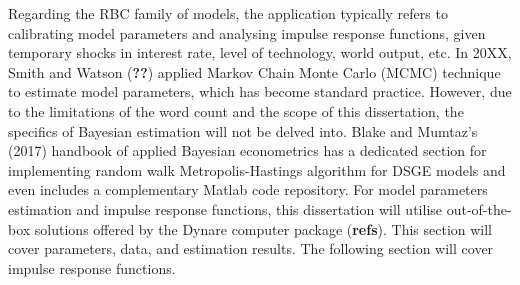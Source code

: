 Regarding the RBC family of models, the application typically refers to calibrating model parameters and analysing impulse response functions, given temporary shocks in interest rate, level of technology, world output, etc. In 20XX, Smith and Watson (\textbf{??}) applied Markov Chain Monte Carlo (MCMC) technique to estimate model parameters, which has become standard practice. However, due to the limitations of the word count and the scope of this dissertation, the specifics of Bayesian estimation will not be delved into. Blake and Mumtaz's (2017) handbook of applied Bayesian econometrics has a dedicated section for implementing random walk Metropolis-Hastings algorithm for DSGE models and even includes a complementary Matlab code repository. For model parameters estimation and impulse response functions, this dissertation will utilise out-of-the-box solutions offered by the Dynare computer package (\textbf{refs}). This section will cover parameters, data, and estimation results. The following section will cover impulse response functions.

